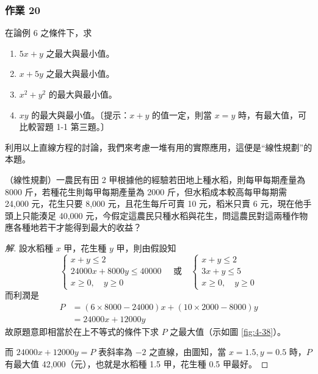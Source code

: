 \subsubsection*{作業 20}
在論例 6 之條件下，求
\begin{enumerate}[label=(\roman*), leftmargin=2em]
  \item $5x + y$ 之最大與最小值。
  \item $x + 5y$ 之最大與最小值。
  \item $x^2 + y^2$ 的最大與最小值。
  \item $xy$ 的最大與最小值。〔提示：$x + y$ 的值一定，則當 $x = y$ 時，有最大值，可比較習題 1-1 第三題。〕
\end{enumerate}

利用以上直線方程的討論，我們來考慮一堆有用的實際應用，這便是“線性規劃”的本題。

\begin{example}[論例 7]
（線性規劃）一農民有田 2 甲根據他的經驗若田地上種水稻，則每甲每期產量為 8000 斤，若種花生則每甲每期產量為 2000 斤，但水稻成本較高每甲每期需 24,000 元，花生只要 8,000 元，且花生每斤可賣 10 元，稻米只賣 6 元，現在他手頭上只能湊足 40,000 元，今假定這農民只種水稻與花生，問這農民對這兩種作物應各種地若干才能得到最大的收益？
\end{example}

\begin{proof}[解]
設水稻種 $x$ 甲，花生種 $y$ 甲，則由假設知
\[ \begin{cases}
x + y \le 2 \\
24000x + 8000y \le 40000 \\
x \ge 0, \quad y \ge 0
\end{cases}
\quad\text{或}\quad
\begin{cases}
x + y \le 2 \\
3x + y \le 5 \\
x \ge 0, \quad y \ge 0
\end{cases} \]
而利潤是
\begin{align*}
P &= (6 \times 8000 - 24000)x + (10 \times 2000 - 8000)y \\
&= 24000x + 12000y
\end{align*}
故原題意即相當於在上不等式的條件下求 $P$ 之最大值（示如圖 \ref{fig:4-38}）。

而 $24000x + 12000y = P$ 表斜率為 $-2$ 之直線，由圖知，當 $x = 1.5, y = 0.5$ 時，$P$ 有最大值 42,000（元），也就是水稻種 1.5 甲，花生種 0.5 甲最好。
\end{proof}

